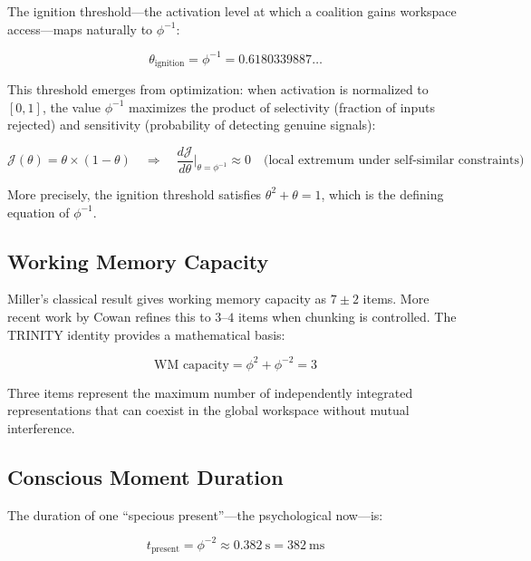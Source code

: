 \documentclass[12pt,a4paper]{article}
\begin{document}
The ignition threshold---the activation level at which a coalition gains
workspace access---maps naturally to $\phi^{-1}$:

\begin{equation}
\theta_{\mathrm{ignition}} = \phi^{-1} = 0.6180339887\ldots
\label{eq:ignition}
\end{equation}

This threshold emerges from optimization: when activation is normalized to
$[0, 1]$, the value $\phi^{-1}$ maximizes the product of selectivity (fraction
of inputs rejected) and sensitivity (probability of detecting genuine signals):

\begin{equation}
\mathcal{J}(\theta) = \theta \times (1 - \theta) \quad \Rightarrow \quad
\frac{d\mathcal{J}}{d\theta}\bigg|_{\theta = \phi^{-1}} \approx 0
\quad \text{(local extremum under self-similar constraints)}
\end{equation}

\noindent
More precisely, the ignition threshold satisfies $\theta^2 + \theta = 1$, which
is the defining equation of $\phi^{-1}$.

\subsection{Working Memory Capacity}

Miller's classical result gives working memory capacity as $7 \pm 2$ items. More
recent work by Cowan \cite{Dehaene2014} refines this to $3$--$4$ items when
chunking is controlled. The TRINITY identity provides a mathematical basis:

\begin{equation}
\text{WM capacity} = \phi^2 + \phi^{-2} = 3
\end{equation}

\noindent
Three items represent the maximum number of independently integrated
representations that can coexist in the global workspace without mutual
interference.

\subsection{Conscious Moment Duration}

The duration of one ``specious present''---the psychological now---is:

\begin{equation}
t_{\mathrm{present}} = \phi^{-2} \approx 0.382~\text{s} = 382~\text{ms}
\end{equation}
\end{document}
